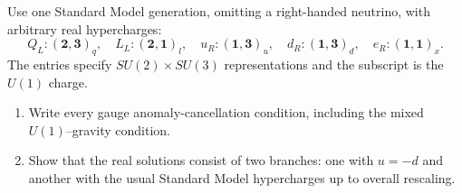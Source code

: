 Use one Standard Model generation, omitting a right-handed neutrino,
with arbitrary real hypercharges:
\begin{equation}
    Q_L:(\mathbf2,\mathbf3)_q,\quad
    L_L:(\mathbf2,\mathbf1)_l,\quad
    u_R:(\mathbf1,\mathbf3)_u,\quad
    d_R:(\mathbf1,\mathbf3)_d,\quad
    e_R:(\mathbf1,\mathbf1)_x.
\end{equation}
The entries specify $SU(2)\times SU(3)$ representations and the
subscript is the $U(1)$ charge.
\begin{enumerate}[label=\roman*)]
    \item Write every gauge anomaly-cancellation condition, including
    the mixed $U(1)$--gravity condition.
    \item Show that the real solutions consist of two branches: one
    with $u=-d$ and another with the usual Standard Model
    hypercharges up to overall rescaling.
\end{enumerate}
